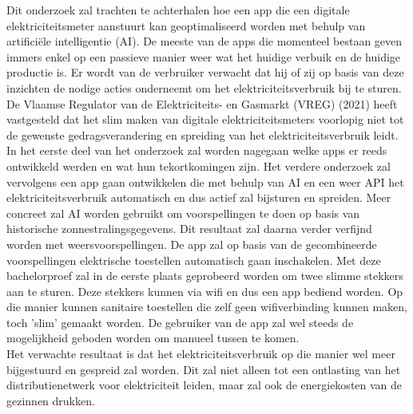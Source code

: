Dit onderzoek zal trachten te achterhalen hoe een app die een digitale elektriciteitsmeter aanstuurt kan geoptimaliseerd worden met behulp van artificiële intelligentie (AI). De meeste van de apps die momenteel bestaan geven immers enkel op een passieve manier weer wat het huidige verbuik en de huidige productie is.  Er wordt van de verbruiker verwacht dat hij of zij op basis van deze inzichten de nodige acties onderneemt om het elektriciteitsverbruik bij te sturen. De Vlaamse Regulator van de Elektriciteits- en Gasmarkt (VREG) (2021) heeft vastgesteld dat het slim maken van digitale elektriciteitsmeters voorlopig niet tot de gewenste gedragsverandering en spreiding van het elektriciteitsverbruik leidt. \\

In het eerste deel van het onderzoek zal worden nagegaan welke apps er reeds ontwikkeld werden en wat hun tekortkomingen zijn. Het verdere onderzoek zal vervolgens een app gaan ontwikkelen die met behulp van AI en een weer API het elektriciteitsverbruik automatisch en dus actief zal bijsturen en spreiden. Meer concreet zal AI worden gebruikt om voorspellingen te doen op basis van historische zonnestralingsgegevens. Dit resultaat zal daarna verder verfijnd worden met weersvoorspellingen. De app zal op basis van de gecombineerde voorspellingen elektrische toestellen automatisch gaan inschakelen. Met deze bachelorproef zal in de eerste plaats geprobeerd worden om twee slimme stekkers aan te sturen. Deze stekkers kunnen via wifi en dus een app bediend worden. Op die manier kunnen sanitaire toestellen die zelf geen wifiverbinding kunnen maken, toch 'slim' gemaakt worden. De gebruiker van de app zal wel steeds de mogelijkheid geboden worden om manueel tussen te komen. \\

Het verwachte resultaat is dat het elektriciteitsverbruik op die manier wel meer bijgestuurd en gespreid zal worden. Dit zal niet alleen tot een ontlasting van het distributienetwerk voor elektriciteit leiden, maar zal ook de energiekosten van de gezinnen drukken.
